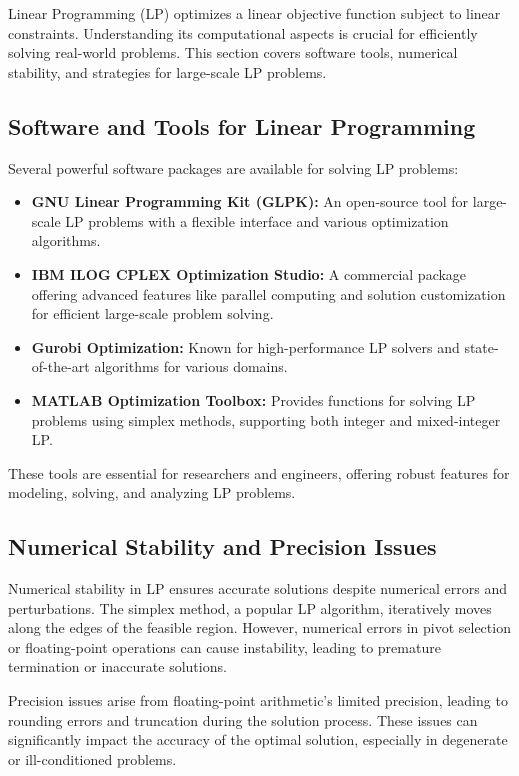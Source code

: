 \documentclass[12pt]{book} %
\begin{document}
Linear Programming (LP) optimizes a linear objective function subject to linear constraints. Understanding its computational aspects is crucial for efficiently solving real-world problems. This section covers software tools, numerical stability, and strategies for large-scale LP problems.

\subsection{Software and Tools for Linear Programming}

Several powerful software packages are available for solving LP problems:

\begin{itemize}
    \item \textbf{GNU Linear Programming Kit (GLPK):} An open-source tool for large-scale LP problems with a flexible interface and various optimization algorithms.
    \item \textbf{IBM ILOG CPLEX Optimization Studio:} A commercial package offering advanced features like parallel computing and solution customization for efficient large-scale problem solving.
    \item \textbf{Gurobi Optimization:} Known for high-performance LP solvers and state-of-the-art algorithms for various domains.
    \item \textbf{MATLAB Optimization Toolbox:} Provides functions for solving LP problems using simplex methods, supporting both integer and mixed-integer LP.
\end{itemize}

These tools are essential for researchers and engineers, offering robust features for modeling, solving, and analyzing LP problems.

\subsection{Numerical Stability and Precision Issues}

Numerical stability in LP ensures accurate solutions despite numerical errors and perturbations. The simplex method, a popular LP algorithm, iteratively moves along the edges of the feasible region. However, numerical errors in pivot selection or floating-point operations can cause instability, leading to premature termination or inaccurate solutions.

Precision issues arise from floating-point arithmetic's limited precision, leading to rounding errors and truncation during the solution process. These issues can significantly impact the accuracy of the optimal solution, especially in degenerate or ill-conditioned problems.
\end{document}

